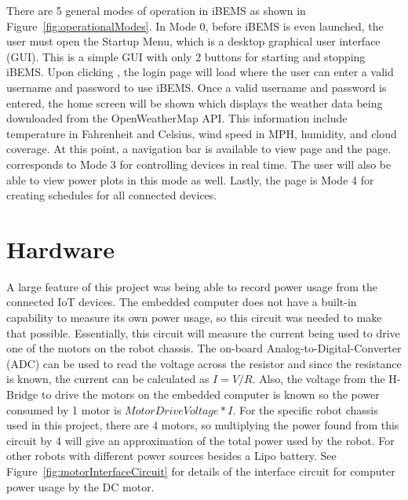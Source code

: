 There are 5 general modes of operation in iBEMS as shown in Figure~\ref{fig:operationalModes}. In Mode 0, before iBEMS is even launched, the user must open the Startup Menu, which is a desktop graphical user interface (GUI). This is a simple GUI with only 2 buttons for starting and stopping iBEMS. Upon clicking , the login page will load where the user can enter a valid username and password to use iBEMS. Once a valid username and password is entered, the home screen will be shown which displays the weather data being downloaded from the OpenWeatherMap API. This information include temperature in Fahrenheit and Celsius, wind speed in MPH, humidity, and cloud coverage. At this point, a navigation bar is available to view  page and the  page.  corresponds to Mode 3 for controlling devices in real time. The user will also be able to view power plots in this mode as well. Lastly, the  page is Mode 4 for creating schedules for all connected devices.

\section{Hardware}

A large feature of this project was being able to record power usage from the
connected IoT devices. The embedded computer does not have a built-in capability
to measure its own power usage, so this circuit was needed to make that
possible. Essentially, this circuit will measure the current being used to drive
one of the motors on the robot chassis. The on-board Analog-to-Digital-Converter
(ADC) can be used to read the voltage across the resistor and since the
resistance is known, the current can be calculated as $I = V/R$. Also, the
voltage from the H-Bridge to drive the motors on the embedded computer is known
so the power consumed by 1 motor is $Motor Drive Voltage * I$. For the specific
robot chassis used in this project, there are 4 motors, so multiplying the power
found from this circuit by 4 will give an approximation of the total power used
by the robot. For other robots with different power sources besides a Lipo
battery. See Figure~\ref{fig:motorInterfaceCircuit} for details of the interface
circuit for computer power usage by the DC motor. 

